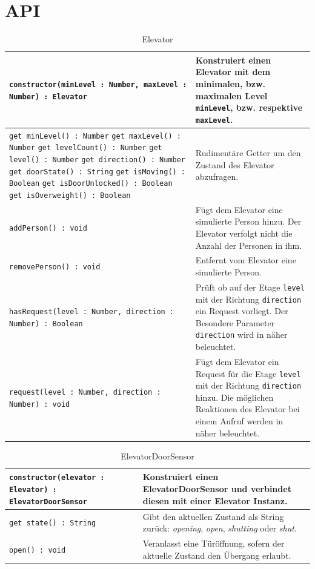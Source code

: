 \newpage
\section{API}
\label{imp_api}
\begin{table}[h!]
	\begin{tabularx}{0.92\textwidth}{XX}
		\texttt{constructor(minLevel : Number, maxLevel : Number) : Elevator} & Konstruiert einen Elevator mit dem minimalen, bzw. maximalen Level \texttt{minLevel}, bzw. respektive \texttt{maxLevel}. \\ \hline
		\texttt{get minLevel() : Number}
		\texttt{get maxLevel() : Number}
		\texttt{get levelCount() : Number}
		\texttt{get level() : Number}
		\texttt{get direction() : Number}
		\texttt{get doorState() : String}
		\texttt{get isMoving() : Boolean}
		\texttt{get isDoorUnlocked() : Boolean}
		\texttt{get isOverweight() : Boolean}                             & Rudimentäre Getter um den Zustand des Elevator abzufragen. \\ \hline
		\texttt{addPerson() : void}                                       & Fügt dem Elevator eine simulierte Person hinzu. Der Elevator verfolgt nicht die Anzahl der Personen in ihm. \\ \hline
		\texttt{removePerson() : void}                                    & Entfernt vom Elevator eine simulierte Person. \\ \hline
		\texttt{hasRequest(level : Number, direction : Number) : Boolean} & Prüft ob auf der Etage \texttt{level} mit der Richtung \texttt{direction} ein Request vorliegt. Der Besondere Parameter \texttt{direction} wird in \textit{\nameref{imp_model}} näher beleuchtet. \\ \hline
		\texttt{request(level : Number, direction : Number) : void}       & Fügt dem Elevator ein Request für die Etage \texttt{level} mit der Richtung \texttt{direction} hinzu. Die möglichen Reaktionen des Elevator bei einem Aufruf werden in \textit{\nameref{imp_model}} näher beleuchtet. \\ \hline
	\end{tabularx}
\caption{Elevator}
\end{table}

\begin{table}[h!]
	\begin{tabularx}{0.92\textwidth}{XX}
		\texttt{constructor(elevator : Elevator) : ElevatorDoorSensor} & Konstruiert einen ElevatorDoorSensor und verbindet diesen mit einer Elevator Instanz. \\ \hline
		\texttt{get state() : String} & Gibt den aktuellen Zustand als String zurück: \textit{opening}, \textit{open}, \textit{shutting} oder \textit{shut}. \\ \hline
		\texttt{open() : void}        & Veranlasst eine Türöffnung, sofern der aktuelle Zustand den Übergang erlaubt. \\ \hline
	\end{tabularx}
\caption{ElevatorDoorSensor}
\end{table}

